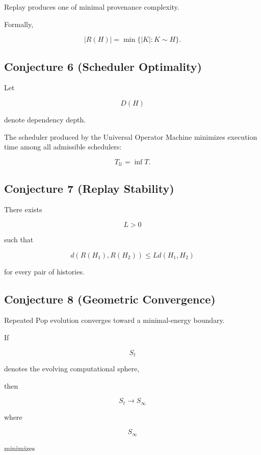 \documentclass[12pt,oneside]{article}
\theoremstyle{definition}
\theoremstyle{remark}
\begin{document}
Replay produces one of minimal provenance complexity.

Formally,

\[
|R(H)|
=
\min
\{
|K|
:
K
\sim
H
\}.
\]

\subsection*{Conjecture 6 (Scheduler Optimality)}

Let

\[
D(H)
\]

denote dependency depth.

The scheduler produced by the Universal Operator Machine minimizes execution
time among all admissible schedulers:

\[
T_{\mathcal U}
=
\inf
T.
\]

\subsection*{Conjecture 7 (Replay Stability)}

There exists

\[
L>0
\]

such that

\[
d(R(H_1),R(H_2))
\le
L
d(H_1,H_2)
\]

for every pair of histories.

\subsection*{Conjecture 8 (Geometric Convergence)}

Repeated Pop evolution converges toward a minimal-energy boundary.

If

\[
S_t
\]

denotes the evolving computational sphere,

then

\[
S_t
\rightarrow
S_\infty
\]

where

\[
S_\infty
\]

minimizes
\end{document}
